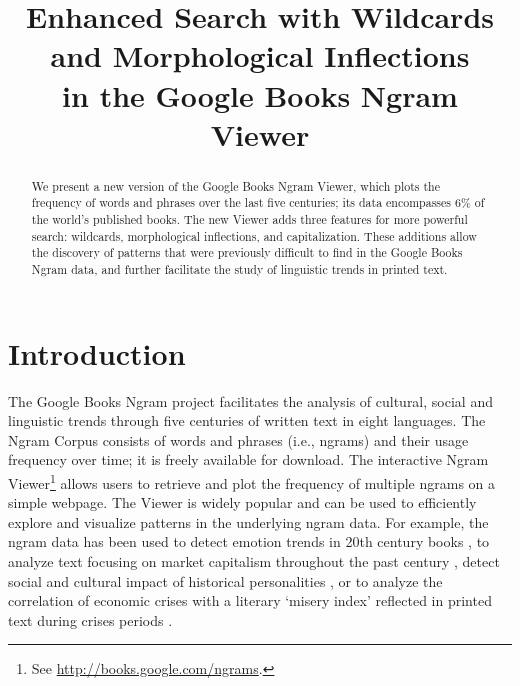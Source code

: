 \documentclass[11pt]{article}
\title{Enhanced Search with Wildcards and Morphological Inflections\\in the Google Books Ngram Viewer}
\date{}
\begin{document}
\maketitle

\begin{abstract}

We present a new version of the Google Books Ngram Viewer, which plots
the frequency of words and phrases over the last five
centuries; its data encompasses 6\% of the world's published books.
The new Viewer adds three features for more powerful search: wildcards,
morphological inflections, and capitalization. These additions allow
the discovery of patterns that were previously difficult to find in the Google Books Ngram data,
and further facilitate the study of linguistic trends in printed text.

\end{abstract}

\section{Introduction}

The Google Books Ngram project facilitates the analysis of cultural, social and linguistic trends through five centuries of written text in eight languages. The Ngram Corpus \cite{culturomics,lin2012syntactic} consists of words and phrases (i.e., ngrams) and their usage frequency over time; it is freely available for download. The interactive Ngram Viewer\footnote{See \url{http://books.google.com/ngrams}.} allows users to retrieve and plot the frequency of multiple ngrams on a simple webpage. The Viewer is widely popular and can be used to efficiently explore and visualize patterns in the underlying ngram data. For example, the ngram data has been used to detect emotion trends in 20th century books \cite{acerbi.etal.2013}, to analyze text focusing on market capitalism throughout the past century \cite{Schulz2013}, detect social and cultural impact of historical personalities \cite{skiena.ward.2013}, or to analyze the correlation of economic crises with a literary `misery index' reflected in printed text during crises periods \cite{bentley.et.al.2014}.
\end{document}
